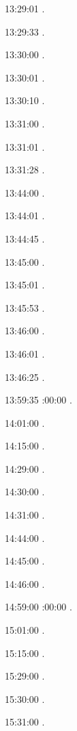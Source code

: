 13:29:01 . 

13:29:33 . 

13:30:00 .

13:30:01 .

13:30:10 .

13:31:00 .

13:31:01 .

13:31:28 .

13:44:00 .

13:44:01 .

13:44:45 .

13:45:00 .

13:45:01 .

13:45:53 .

13:46:00 .

13:46:01 .

13:46:25 .

13:59:35 
:00:00 .

14:01:00 . 

14:15:00 . 

14:29:00 . 

14:30:00 .

14:31:00 .

14:44:00 .

14:45:00 .

14:46:00 .

14:59:00 
:00:00 .

15:01:00 . 

15:15:00 . 

15:29:00 . 

15:30:00 .

15:31:00 .

